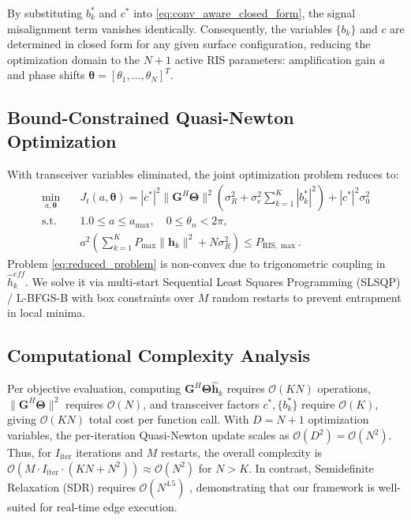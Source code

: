 \documentclass[journal,twocolumn]{IEEEtran}
\begin{document}
By substituting $b_k^*$ and $c^*$ into \eqref{eq:conv_aware_closed_form}, the signal misalignment term vanishes identically. Consequently, the variables $\{b_k\}$ and $c$ are determined in closed form for any given surface configuration, reducing the optimization domain to the $N+1$ active RIS parameters: amplification gain $a$ and phase shifts $\boldsymbol{\theta} = [\theta_1, \dots, \theta_N]^T$.

\subsection{Bound-Constrained Quasi-Newton Optimization}
With transceiver variables eliminated, the joint optimization problem reduces to:
\begin{align}
    \min_{a, \boldsymbol{\theta}} \quad & J_t(a, \boldsymbol{\theta}) = |c^*|^2 \|\mathbf{G}^H \mathbf{\Theta}\|^2 \left(\sigma_R^2 + \sigma_e^2 \sum_{k=1}^K |b_k^*|^2\right) + |c^*|^2 \sigma_0^2 \nonumber \\
    \text{s.t.} \quad & 1.0 \le a \le a_{\max}, \quad 0 \le \theta_n < 2\pi, \nonumber \\
    & a^2 \left(\sum_{k=1}^K P_{\max} \|\mathbf{h}_k\|^2 + N \sigma_R^2\right) \le P_{\text{RIS},\max}.
    \label{eq:reduced_problem}
\end{align}
Problem \eqref{eq:reduced_problem} is non-convex due to trigonometric coupling in $\hat{h}_k^{eff}$. We solve it via multi-start Sequential Least Squares Programming (SLSQP) / L-BFGS-B with box constraints over $M$ random restarts to prevent entrapment in local minima.

\subsection{Computational Complexity Analysis}
Per objective evaluation, computing $\mathbf{G}^H \mathbf{\Theta} \hat{\mathbf{h}}_k$ requires $\mathcal{O}(K N)$ operations, $\|\mathbf{G}^H \mathbf{\Theta}\|^2$ requires $\mathcal{O}(N)$, and transceiver factors $c^*, \{b_k^*\}$ require $\mathcal{O}(K)$, giving $\mathcal{O}(K N)$ total cost per function call. With $D = N+1$ optimization variables, the per-iteration Quasi-Newton update scales as $\mathcal{O}(D^2) = \mathcal{O}(N^2)$. Thus, for $I_{\text{iter}}$ iterations and $M$ restarts, the overall complexity is $\mathcal{O}(M \cdot I_{\text{iter}} \cdot (K N + N^2)) \approx \mathcal{O}(N^2)$ for $N > K$. In contrast, Semidefinite Relaxation (SDR) requires $\mathcal{O}(N^{4.5})$ \cite{anish_pradhan_defb987b}, demonstrating that our framework is well-suited for real-time edge execution.
\end{document}
